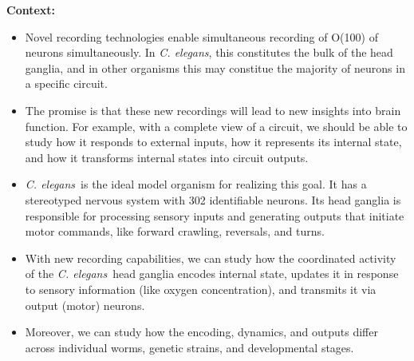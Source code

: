 \documentclass[11pt]{article}
\newcommand{\celegans}{\textit{C. elegans}}
\begin{document}
\textbf{Context:}
\begin{itemize}
\item Novel recording technologies enable simultaneous recording of
  O(100) of neurons simultaneously.  In \celegans, this constitutes
  the bulk of the head ganglia, and in other organisms this may constitue
  the majority of neurons in a specific circuit.
\item The promise is that these new recordings will lead to new
  insights into brain function. For example, with a complete view of a
  circuit, we should be able to study how it responds to external
  inputs, how it represents its internal state, and how it transforms
  internal states into circuit outputs.
\item \celegans~is the ideal model organism for realizing
  this goal.  It has a stereotyped nervous system with 302 identifiable
  neurons.  Its head ganglia is responsible for
  processing sensory inputs and generating outputs that initiate
  motor commands, like forward crawling, reversals, and turns.
\item With new recording capabilities, we can study how the
  coordinated activity of the \celegans~head ganglia encodes internal
  state, updates it in response to sensory information (like oxygen
  concentration), and transmits it via output (motor) neurons.
\item Moreover, we can study how the encoding, dynamics, and outputs
  differ across individual worms, genetic strains, and developmental stages.
\end{itemize}
\end{document}
